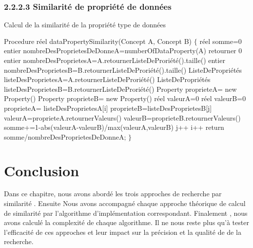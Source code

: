     \subsubsection{2.2.2.3 Similarité de propriété de données}
	\begin{algorithm}[H]
	\caption{ Calcul de la similarité de la propriété type de données }
	\begin{algorithmic}[1]
	\State Procedure réel dataPropertySimilarity(Concept A, Concept B)
    \State $\{$
	\State réel somme=0
	\State entier nombreDesProprietesDeDonneA=numberOfDataProperty(A)
	\State retourner 0
	\EndIf
	\State entier nombreDesProprietesA=A.retournerListeDeProriété().taille()
	\State entier nombreDesProprietesB=B.retournerListeDeProriété().taille()
	\State ListeDePropriétés listeDesProprietesA=A.retournerListeDeProriété()
	\State ListeDePropriétés listeDesProprietesB=B.retournerListeDeProriété()
	\State Property proprieteA= new Property()
	\State Property proprieteB= new Property()
	\State réel valeurA=0
	\State réel valeurB=0
    \State proprieteA= listeDesProprietesA[i]
	\State proprieteB=listeDesProprietesB[j]
	\State valeurA=proprieteA.retournerValeurs()
	\State valeurB=proprieteB.retournerValeurs()
	\State somme+=1-abs(valeurA-valeurB)/max(valeurA,valeurB)
	\EndIf
    \State j++
	\EndFor
    \State i++	
	\EndFor
	\State return somme/nombreDesProprietesDeDonneA;
	\State $\}$
	\end{algorithmic}
\end{algorithm}






\section{Conclusion}
    Dans ce chapitre, nous avons abordé les trois approches de recherche par similarité . Ensuite Nous avons accompagné chaque approche théorique de calcul de similarité par l'algorithme d'implémentation correspondant.
	Finalement , nous avons calculé la complexité de chaque algorithme.
	Il ne nous reste plus qu’à tester l’efficacité de ces  approches et leur impact sur la précision et la qualité de de la recherche.




















